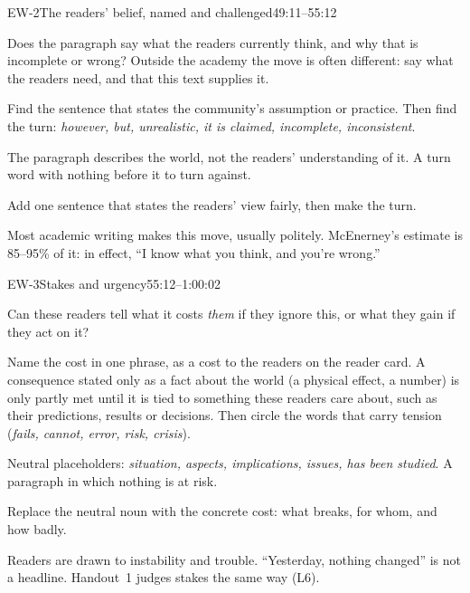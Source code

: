 \documentclass[11pt]{article}
\begin{document}
\begin{criterion}{EW-2}{The readers' belief, named and challenged}{49:11--55:12}
\begin{fields}
  \item[Ask] Does the paragraph say what the readers currently think, and why that is incomplete or wrong?
    Outside the academy the move is often different: say what the readers need, and that this text supplies it.
  \item[Check] Find the sentence that states the community's assumption or practice. Then find the turn:
    \emph{however, but, unrealistic, it is claimed, incomplete, inconsistent}.
  \item[Red flags] The paragraph describes the world, not the readers' understanding of it. A turn word with
    nothing before it to turn against.
  \item[Fix] Add one sentence that states the readers' view fairly, then make the turn.
  \item[Note] Most academic writing makes this move, usually politely. McEnerney's estimate is 85--95\% of it:
    in effect, ``I know what you think, and you're wrong.''
\end{fields}
\end{criterion}

\begin{criterion}{EW-3}{Stakes and urgency}{55:12--1:00:02}
\begin{fields}
  \item[Ask] Can these readers tell what it costs \emph{them} if they ignore this, or what they gain if they act
    on it?
  \item[Check] Name the cost in one phrase, as a cost to the readers on the reader card. A consequence stated
    only as a fact about the world (a physical effect, a number) is only partly met until it is tied to something these
    readers care about, such as their predictions, results or decisions. Then circle the words that carry tension (\emph{fails, cannot, error, risk, crisis}).
  \item[Red flags] Neutral placeholders: \emph{situation, aspects, implications, issues, has been studied}. A
    paragraph in which nothing is at risk.
  \item[Fix] Replace the neutral noun with the concrete cost: what breaks, for whom, and how badly.
  \item[Note] Readers are drawn to instability and trouble. ``Yesterday, nothing changed'' is not a headline.
    Handout~1 judges stakes the same way (L6).
\end{fields}
\end{criterion}
\end{document}
